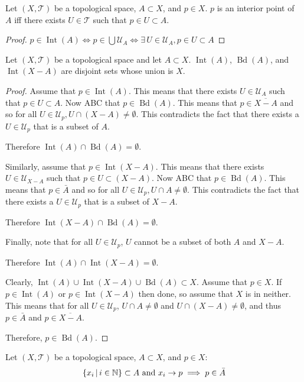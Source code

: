 \documentclass[letterpaper,12pt,fleqn]{article}
\newcommand{\T}{\mathscr{T}}
\newcommand{\U}{\mathcal{U}}
\DeclareMathOperator{\Int}{Int}
\DeclareMathOperator{\Bd}{Bd}
\begin{document}
\begin{theorem}[2.26]
  Let \((X,\T)\) be a topological space, \(A\subset X\), and \(p\in X\).  \(p\) is an interior point of \(A\) iff
  there exists \(U\in\T\) such that \(p\in U\subset A\).
\end{theorem}

\begin{proof}
  \(p\in\Int(A)\iff p\in\bigcup\U_A\iff\exists\,U\in\U_A,p\in U\subset A\)
\end{proof}

\begin{theorem}[2.28]
  Let \((X,\T)\) be a topological space and let \(A\subset X\).  \(\Int(A)\), \(\Bd(A)\), and \(\Int(X-A)\) are
  disjoint sets whose union is \(X\).
\end{theorem}

\begin{proof}
  Assume that \(p\in\Int(A)\).  This means that there exists \(U\in\U_A\) such that \(p\in U\subset A\).  Now ABC
  that \(p\in\Bd(A)\).  This means that \(p\in\overline{X-A}\) and so for all \(U\in\U_p, U\cap(X-A)\ne\emptyset\).
  This contradicts the fact that there exists a \(U\in\U_p\) that is a subset of \(A\).

  Therefore \(\Int(A)\cap\Bd(A)=\emptyset\).

  Similarly, assume that \(p\in\Int(X-A)\).  This means that there exists \(U\in\U_{X-A}\) such that \(p\in
  U\subset(X-A)\).  Now ABC that \(p\in\Bd(A)\).  This means that \(p\in\bar{A}\) and so for all \(U\in\U_p, U\cap
  A\ne\emptyset\).  This contradicts the fact that there exists a \(U\in\U_p\) that is a subset of \(X-A\).

  Therefore \(\Int(X-A)\cap\Bd(A)=\emptyset\).

  Finally, note that for all \(U\in\U_p\), \(U\) cannot be a subset of both \(A\) and \(X-A\).

  Therefore \(\Int(A)\cap\Int(X-A)=\emptyset\).

  Clearly, \(\Int(A)\cup\Int(X-A)\cup\Bd(A)\subset X\).  Assume that \(p\in X\).  If \(p\in\Int(A)\) or
  \(p\in\Int(X-A)\) then done, so assume that \(X\) is in neither.  This means that for all \(U\in\U_p\),
  \(U\cap A\ne\emptyset\) and \(U\cap(X-A)\ne\emptyset\), and thus \(p\in\bar{A}\) and \(p\in\overline{X-A}\).

  Therefore, \(p\in\Bd(A)\).
\end{proof}

\begin{theorem}[2.30]
  Let \((X,\T)\) be a topological space, \(A\subset X\), and \(p\in X\):
  \[\setb{x_i}{i\in\N}\subset A\ \text{and}\ x_i\to p\implies p\in\bar{A}\]
\end{theorem}
\end{document}
